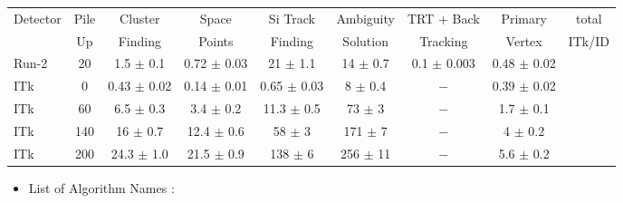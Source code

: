 \documentclass{beamer}
\begin{document}
\begin{frame}
\begin{table}
{{\begin{tabular}{|l|c||c|c|c|c|c|c||c|}
Detector&  Pile &              Cluster           &              Space                  &         Si Track                       &         Ambiguity               &          TRT + Back              &           Primary                &        total              \\ 
             &  Up  &               Finding          &              Points                 &         Finding                        &         Solution                  &           Tracking                 &           Vertex                  &        ITk/ID            \\ \hline
Run-2   & 20   &  1.5 $\pm$ 0.1            &  0.72 $\pm$ 0.03            &    21 $\pm$ 1.1                   & 14 $\pm$ 0.7                  &        0.1 $\pm$ 0.003      &     0.48 $\pm$ 0.02        &                              \\\hline
ITk        & 0     &  0.43 $\pm$ 0.02        &  0.14 $\pm$ 0.01            &   0.65 $\pm$ 0.03               & 8 $\pm$ 0.4                    &               $-$                    &    0.39 $\pm$ 0.02         &                              \\\hline
ITk        & 60   &  6.5 $\pm$ 0.3            &  3.4 $\pm$ 0.2                &   11.3 $\pm$ 0.5                 &  73 $\pm$ 3                    &               $-$                    &     1.7 $\pm$ 0.1            &                              \\\hline
ITk        & 140 &  16 $\pm$ 0.7             &  12.4 $\pm$ 0.6              &   58 $\pm$ 3                       &  171 $\pm$ 7                  &               $-$                    &    4 $\pm$ 0.2                &                              \\\hline
ITk        & 200 &  24.3 $\pm$ 1.0          &  21.5 $\pm$ 0.9              &   138 $\pm$ 6                     &  256 $\pm$ 11                &               $-$                    &     5.6 $\pm$ 0.2            &                              \\\hline
\hline
\end{tabular}
}}
\end{table}

\vspace*{0.5cm} 

\begin{itemize}
\item {\small List of Algorithm Names :} 
\end{itemize}
\vspace*{-0.5cm} 
\begin{table}


\end{table}
\end{frame}
\end{document}
